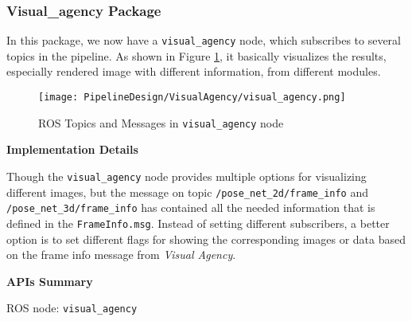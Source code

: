 \subsubsection{Visual\_agency Package}

In this package, we now have a \texttt{visual\_agency} node, which subscribes to several topics in the pipeline. As shown in Figure \ref{fig:visual_agency}, it basically visualizes the results, especially rendered image with different information, from different modules.    

\begin{figure}[h!]
  \centering
  \texttt{[image: PipelineDesign/VisualAgency/visual\_agency.png]}
  \caption{ROS Topics and Messages in \texttt{visual\_agency} node}  
  \label{fig:visual_agency}
\end{figure}  

\textbf{Implementation Details}

Though the \texttt{visual\_agency} node provides multiple options for visualizing different images, but 
the message on topic \texttt{/pose\_net\_2d/frame\_info} and \texttt{/pose\_net\_3d/frame\_info} has contained all the needed information that is defined in the \texttt{FrameInfo.msg}. Instead of setting different subscribers, a better option is to set different flags for showing the corresponding images or data based on the frame info message from \textit{Visual Agency}. 

\textbf{APIs Summary}

ROS node: \texttt{visual\_agency}

